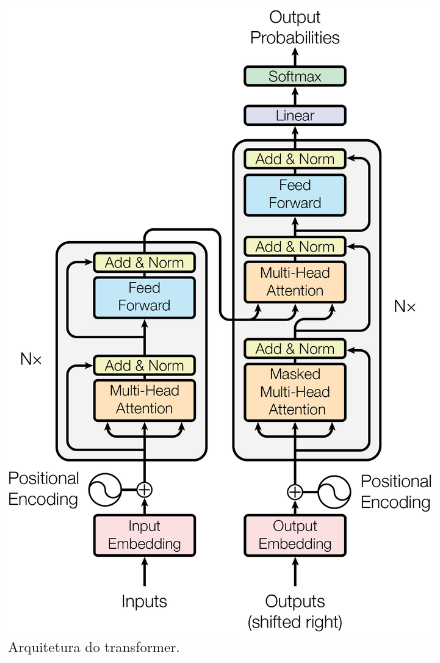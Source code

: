 
\begin{figure}
  \begin{minipage}[b]{0.5\textwidth}
    \includegraphics[scale=0.5]{images/ModalNet-21}
    \caption{Arquitetura do transformer.}
    \label{fig:transformer-arch}
  \end{minipage}
  \begin{minipage}[b]{0.5\textwidth}

\end{minipage}
\end{figure}
